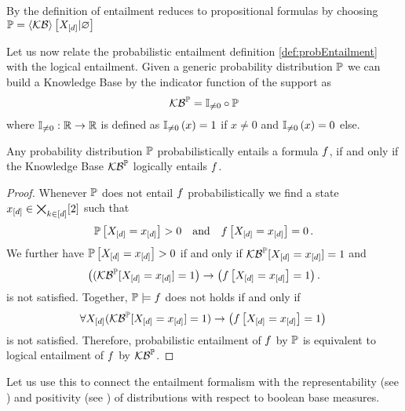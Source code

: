 %
By  the definition of entailment reduces to propositional formulas by choosing $\mathbb{P}=\left\langle \mathcal{KB}\right\rangle \left[ X_{[d]} | \varnothing \right]$












Let us now relate the probabilistic entailment definition \ref{def:probEntailment} with the logical entailment.
Given a generic probability distribution $\mathbb{P}$ we can build a Knowledge Base by the indicator function of the support as 
	\[ \mathcal{KB}^{\mathbb{P}} = \mathbb{I}_{\neq0} \circ \mathbb{P} \]
where $\mathbb{I}_{\neq0}:\mathbb{R}\rightarrow \mathbb{R}$ is defined as $\mathbb{I}_{\neq0}\left(x\right)=1$ if $x\neq0$ and $\mathbb{I}_{\neq0}\left(x\right)=0$ else.

\begin{theorem}\label{the:entailmentProbToLogical}
	Any probability distribution $\mathbb{P}$ probabilistically entails a formula $f$, if and only if the Knowledge Base $\mathcal{KB}^{\mathbb{P}}$ logically entails $f$.
\end{theorem}
\begin{proof}
	Whenever $\mathbb{P}$ does not entail $f$ probabilistically we find a state $x_{[d]}\in\bigtimes_{k\in[d]}[2]$ such that
		\[ \mathbb{P}\left[X_{[d]}=x_{[d]}\right] >0 \quad\text{and} \quad f\left[X_{[d]}=x_{[d]}\right] = 0 \, . \]
	We further have $\mathbb{P}\left[X_{[d]}=x_{[d]}\right] >0$ if and only if $\mathcal{KB}^{\mathbb{P}}[X_{[d]}=x_{[d]}]=1$ and
		\[ \big((\mathcal{KB}^{\mathbb{P}}[X_{[d]}=x_{[d]}]=1\big) \rightarrow \big(f\left[X_{[d]}=x_{[d]}\right]=1\big) \, . \]
	is not satisfied.
	Together, $\mathbb{P}\models f$ does not holds if and only if
		\[ \forall X_{[d]} (\mathcal{KB}^{\mathbb{P}}[X_{[d]}=x_{[d]}]=1) \rightarrow \big(f\left[X_{[d]}=x_{[d]}\right]=1\big) \,  \]
	is not satisfied. 
	Therefore, probabilistic entailment of $f$ by $\mathbb{P}$ is equivalent to logical entailment of $f$ by $\mathcal{KB}^{\mathbb{P}}$.
\end{proof}

Let us use this to connect the entailment formalism with the representability (see ) and positivity (see ) of distributions with respect to boolean base measures.


